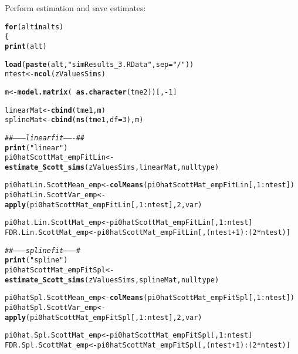 \documentclass{article}\usepackage[]{graphicx}\usepackage[]{color}
\makeatletter
\newcommand{\hlnum}[1]{\textcolor[rgb]{0.686,0.059,0.569}{#1}}%
\newcommand{\hlstr}[1]{\textcolor[rgb]{0.192,0.494,0.8}{#1}}%
\newcommand{\hlcom}[1]{\textcolor[rgb]{0.678,0.584,0.686}{\textit{#1}}}%
\newcommand{\hlopt}[1]{\textcolor[rgb]{0,0,0}{#1}}%
\newcommand{\hlstd}[1]{\textcolor[rgb]{0.345,0.345,0.345}{#1}}%
\newcommand{\hlkwa}[1]{\textcolor[rgb]{0.161,0.373,0.58}{\textbf{#1}}}%
\newcommand{\hlkwb}[1]{\textcolor[rgb]{0.69,0.353,0.396}{#1}}%
\newcommand{\hlkwc}[1]{\textcolor[rgb]{0.333,0.667,0.333}{#1}}%
\newcommand{\hlkwd}[1]{\textcolor[rgb]{0.737,0.353,0.396}{\textbf{#1}}}%
\newenvironment{kframe}{%
 \def\at@end@of@kframe{}%
 \ifinner\ifhmode%
  \def\at@end@of@kframe{\end{minipage}}%
  \begin{minipage}{\columnwidth}%
 \fi\fi%
 \def\FrameCommand##1{\hskip\@totalleftmargin \hskip-\fboxsep
 \colorbox{shadecolor}{##1}\hskip-\fboxsep
     \hskip-\linewidth \hskip-\@totalleftmargin \hskip\columnwidth}%
 \MakeFramed {\advance\hsize-\width
   \@totalleftmargin\z@ \linewidth\hsize
   \@setminipage}}%
 {\par\unskip\endMakeFramed%
 \at@end@of@kframe}
\newenvironment{knitrout}{}{} %
\makeatother
\begin{document}
Perform estimation and save estimates:

\begin{knitrout}
\color{fgcolor}\begin{kframe}
\begin{alltt}
\hlkwa{for}\hlstd{(alt} \hlkwa{in} \hlstd{alts)}
\hlstd{\{}
  \hlkwd{print}\hlstd{(alt)}

  \hlkwd{load}\hlstd{(}\hlkwd{paste}\hlstd{(alt,}\hlstr{"simResults_3.RData"}\hlstd{,}\hlkwc{sep}\hlstd{=}\hlstr{"/"}\hlstd{))}
  \hlstd{ntest} \hlkwb{<-} \hlkwd{ncol}\hlstd{(zValuesSims)}

  \hlstd{m} \hlkwb{<-} \hlkwd{model.matrix}\hlstd{(}\hlopt{~}\hlkwd{as.character}\hlstd{(tme2))[,}\hlopt{-}\hlnum{1}\hlstd{]}

  \hlstd{linearMat} \hlkwb{<-} \hlkwd{cbind}\hlstd{(tme1, m)}
  \hlstd{splineMat} \hlkwb{<-} \hlkwd{cbind}\hlstd{(}\hlkwd{ns}\hlstd{(tme1,}\hlkwc{df}\hlstd{=}\hlnum{3}\hlstd{), m)}

  \hlcom{##--------linear fit-------##}
  \hlkwd{print}\hlstd{(}\hlstr{"linear"}\hlstd{)}
  \hlstd{pi0hatScottMat_empFitLin} \hlkwb{<-} \hlkwd{estimate_Scott_sims}\hlstd{(zValuesSims, linearMat, nulltype)}

  \hlstd{pi0hatLin.ScottMean_emp} \hlkwb{<-} \hlkwd{colMeans}\hlstd{(pi0hatScottMat_empFitLin[,}\hlnum{1}\hlopt{:}\hlstd{ntest])}
  \hlstd{pi0hatLin.ScottVar_emp} \hlkwb{<-} \hlkwd{apply}\hlstd{(pi0hatScottMat_empFitLin[,}\hlnum{1}\hlopt{:}\hlstd{ntest],}\hlnum{2}\hlstd{,var)}

  \hlstd{pi0hat.Lin.ScottMat_emp} \hlkwb{<-} \hlstd{pi0hatScottMat_empFitLin[,}\hlnum{1}\hlopt{:}\hlstd{ntest]}
  \hlstd{FDR.Lin.ScottMat_emp} \hlkwb{<-} \hlstd{pi0hatScottMat_empFitLin[,(ntest}\hlopt{+}\hlnum{1}\hlstd{)}\hlopt{:}\hlstd{(}\hlnum{2}\hlopt{*}\hlstd{ntest)]}

  \hlcom{##---------spline fit---------#}
  \hlkwd{print}\hlstd{(}\hlstr{"spline"}\hlstd{)}
  \hlstd{pi0hatScottMat_empFitSpl} \hlkwb{<-} \hlkwd{estimate_Scott_sims}\hlstd{(zValuesSims, splineMat, nulltype)}

  \hlstd{pi0hatSpl.ScottMean_emp} \hlkwb{<-} \hlkwd{colMeans}\hlstd{(pi0hatScottMat_empFitSpl[,}\hlnum{1}\hlopt{:}\hlstd{ntest])}
  \hlstd{pi0hatSpl.ScottVar_emp} \hlkwb{<-} \hlkwd{apply}\hlstd{(pi0hatScottMat_empFitSpl[,}\hlnum{1}\hlopt{:}\hlstd{ntest],}\hlnum{2}\hlstd{,var)}

  \hlstd{pi0hat.Spl.ScottMat_emp} \hlkwb{<-} \hlstd{pi0hatScottMat_empFitSpl[,}\hlnum{1}\hlopt{:}\hlstd{ntest]}
  \hlstd{FDR.Spl.ScottMat_emp} \hlkwb{<-} \hlstd{pi0hatScottMat_empFitSpl[,(ntest}\hlopt{+}\hlnum{1}\hlstd{)}\hlopt{:}\hlstd{(}\hlnum{2}\hlopt{*}\hlstd{ntest)]}


\end{alltt}
\end{kframe}
\end{knitrout}
\end{document}
